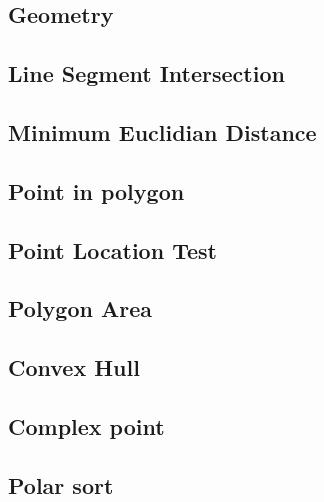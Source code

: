 \documentclass[10pt]{article}
\begin{document}
\begin{multicols*}{2}

\section{Geometry}

\subsection{Line Segment Intersection}


\subsection{Minimum Euclidian Distance}


\subsection{Point in polygon}


\subsection{Point Location Test}


\subsection{Polygon Area}


\subsection{Convex Hull}


\subsection{Complex point}


\subsection{Polar sort}



\end{multicols*}
\end{document}
